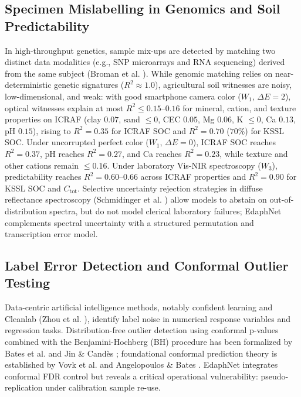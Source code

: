 \documentclass[journal,twoside]{IEEEtran}
\begin{document}
\subsection{Specimen Mislabelling in Genomics and Soil Predictability}
In high-throughput genetics, sample mix-ups are detected by matching two distinct data modalities (e.g., SNP microarrays and RNA sequencing) derived from the same subject (Broman et al. \cite{broman2015sample}). While genomic matching relies on near-deterministic genetic signatures ($R^2 \approx 1.0$), agricultural soil witnesses are noisy, low-dimensional, and weak: with good smartphone camera color ($W_1$, $\Delta E = 2$), optical witnesses explain at most $R^2 \le 0.15\text{--}0.16$ for mineral, cation, and texture properties on ICRAF (clay $0.07$, sand $\le 0$, CEC $0.05$, Mg $0.06$, K $\le 0$, Ca $0.13$, pH $0.15$), rising to $R^2 = 0.35$ for ICRAF SOC and $R^2 = 0.70$ ($70\%$) for KSSL SOC. Under uncorrupted perfect color ($W_1$, $\Delta E = 0$), ICRAF SOC reaches $R^2 = 0.37$, pH reaches $R^2 = 0.27$, and Ca reaches $R^2 = 0.23$, while texture and other cations remain $\le 0.16$. Under laboratory Vis-NIR spectroscopy ($W_3$), predictability reaches $R^2 = 0.60\text{--}0.66$ across ICRAF properties and $R^2 = 0.90$ for KSSL SOC and $C_{\text{tot}}$. Selective uncertainty rejection strategies in diffuse reflectance spectroscopy (Schmidinger et al. \cite{schmidinger2026selective}) allow models to abstain on out-of-distribution spectra, but do not model clerical laboratory failures; EdaphNet complements spectral uncertainty with a structured permutation and transcription error model.

\subsection{Label Error Detection and Conformal Outlier Testing}
Data-centric artificial intelligence methods, notably confident learning and Cleanlab (Zhou et al. \cite{zhou2024detecting}), identify label noise in numerical response variables and regression tasks. Distribution-free outlier detection using conformal p-values combined with the Benjamini-Hochberg (BH) procedure \cite{benjamini1995controlling} has been formalized by Bates et al. \cite{bates2023conformal} and Jin \& Cand\`es \cite{jin2023selection}; foundational conformal prediction theory is established by Vovk et al. \cite{vovk2005algorithmic} and Angelopoulos \& Bates \cite{angelopoulos2023conformal}. EdaphNet integrates conformal FDR control but reveals a critical operational vulnerability: pseudo-replication under calibration sample re-use.
\end{document}

